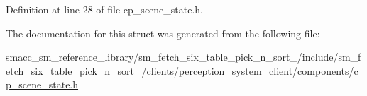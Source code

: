 Definition at line 28 of file cp\+\_\+scene\+\_\+state.\+h.



The documentation for this struct was generated from the following file\+:\begin{DoxyCompactItemize}
\item 
smacc\+\_\+sm\+\_\+reference\+\_\+library/sm\+\_\+fetch\+\_\+six\+\_\+table\+\_\+pick\+\_\+n\+\_\+sort\+\_/include/sm\+\_\+fetch\+\_\+six\+\_\+table\+\_\+pick\+\_\+n\+\_\+sort\+\_/clients/perception\+\_\+system\+\_\+client/components/\hyperlink{sm__fetch__six__table__pick__n__sort__1_2include_2sm__fetch__six__table__pick__n__sort__1_2clien54ffc66dfc7bf07465fd982c3546e037}{cp\+\_\+scene\+\_\+state.\+h}\end{DoxyCompactItemize}
